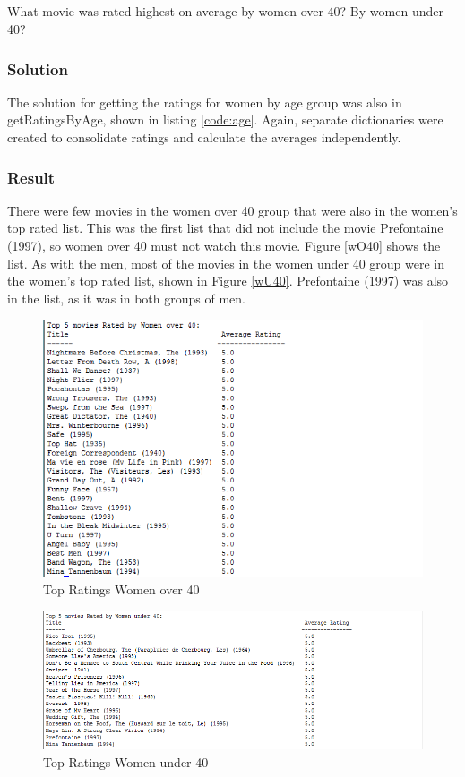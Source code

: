 \documentclass[paper=a4, fontsize=11pt]{scrartcl} %
\numberwithin{equation}{section} %
\numberwithin{figure}{section} %
\numberwithin{table}{section} %
\begin{document}
\subsection{}
What movie was rated highest on average by women over 40?
 By women under 40?

\subsubsection{Solution}
The solution for getting the ratings for women by age group was also in getRatingsByAge, shown in listing \ref{code:age}.
Again, separate dictionaries were created to consolidate ratings and calculate the averages independently.

\subsubsection{Result}
There were few movies in the women over 40 group that were also in the women's top rated list.
This was the first list that did not include the movie  Prefontaine (1997), so women over 40 must not watch this movie.
Figure \ref{wO40} shows the list.
As with the men, most of the movies in the women under 40 group were in the women's top rated list, shown in Figure \ref{wU40}.
 Prefontaine (1997) was also in the list, as it was in both groups of men.

\begin{figure}[H]
\includegraphics[width=1\textwidth]{pics/topWomenO40}
\caption{Top Ratings Women over 40}
\label{fig:wO40}
\end{figure}

\begin{figure}[H]
\includegraphics[width=1.2\textwidth]{pics/topWomenU40}
\caption{Top Ratings Women under 40}
\label{fig:wU40}
\end{figure}
\end{document}

